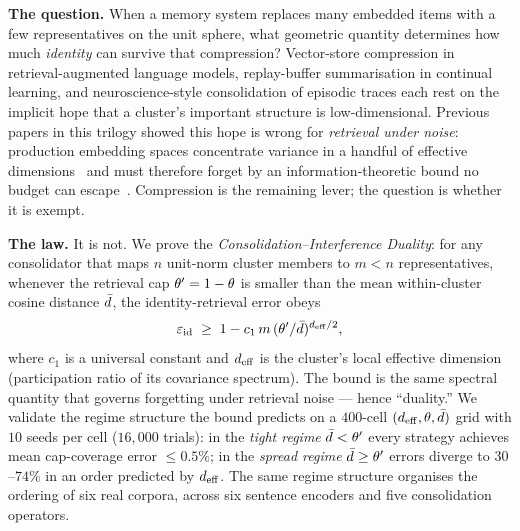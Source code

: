 
\noindent\textbf{The question.} When a memory system replaces many
embedded items with a few representatives on the unit sphere, what
geometric quantity determines how much \emph{identity} can survive that
compression? Vector-store compression in retrieval-augmented language
models, replay-buffer summarisation in continual learning, and
neuroscience-style consolidation of episodic traces each rest on the
implicit hope that a cluster's important structure is
low-dimensional. Previous papers in this trilogy showed this hope is
wrong for \emph{retrieval under noise}: production embedding spaces
concentrate variance in a handful of effective
dimensions~\cite{geometryOfForgetting2026} and must therefore forget by
an information-theoretic bound no budget can
escape~\cite{priceOfMeaning2026}. Compression is the remaining lever;
the question is whether it is exempt.

\medskip
\noindent\textbf{The law.} It is not. We prove the
\emph{Consolidation--Interference Duality}: for any consolidator that
maps $n$ unit-norm cluster members to $m < n$ representatives, whenever
the retrieval cap $\theta' = 1-\theta$ is smaller than the mean
within-cluster cosine distance $\bar{d}$, the identity-retrieval error
obeys
\[
\varepsilon_{\mathrm{id}} \;\geq\; 1 - c_1\,m\,(\theta'/\bar{d})^{{d_{\mathrm{eff}}}/2},
\]
where $c_1$ is a universal constant and ${d_{\mathrm{eff}}}$ is the cluster's local
effective dimension (participation ratio of its covariance
spectrum). The bound is the same spectral quantity that governs
forgetting under retrieval noise --- hence ``duality.'' We validate the
regime structure the bound predicts on a $400$-cell $({d_{\mathrm{eff}}}, \theta,
\bar{d})$ grid with $10$ seeds per cell ($16{,}000$ trials): in the
\emph{tight regime} $\bar{d} < \theta'$ every strategy achieves mean
cap-coverage error $\leq 0.5\%$; in the \emph{spread regime} $\bar{d}
\geq \theta'$ errors diverge to $30$--$74\%$ in an order predicted by
${d_{\mathrm{eff}}}$. The same regime structure organises the ordering of six real
corpora, across six sentence encoders and five consolidation operators.

